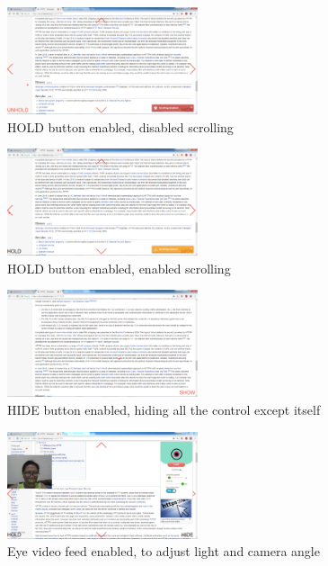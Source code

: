\documentclass[journal]{./IEEE/IEEEtran}
\begin{document}
\begin{figure}[h!]
  \centering
    \includegraphics[width=0.5\textwidth]{./images/holded.png}
  \caption{HOLD button enabled, disabled scrolling}
  \label{fig:7}
\end{figure}
\begin{figure}[h!]
  \centering
    \includegraphics[width=0.5\textwidth]{./images/unholded.png}
  \caption{HOLD button enabled, enabled scrolling}
  \label{fig:8}
\end{figure}
\begin{figure}[h!]
  \centering
    \includegraphics[width=0.5\textwidth]{./images/hidden.png}
  \caption{HIDE button enabled, hiding all the control except itself}
  \label{fig:9}
\end{figure}
\begin{figure}[h!]
  \centering
    \includegraphics[width=0.5\textwidth]{./images/webfeed.png}
  \caption{Eye video feed enabled, to adjust light and camera angle}
  \label{fig:10}
\end{figure}
\end{document}
